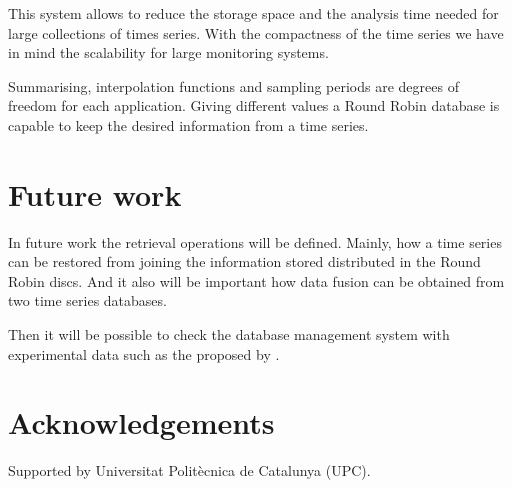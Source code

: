This system allows to reduce the storage space and the analysis time
needed for large collections of times series.  With the compactness of
the time series we have in mind the scalability for large monitoring
systems.

Summarising, interpolation functions and sampling periods are degrees
of freedom for each application. Giving different values a Round Robin
database is capable to keep the desired information from a time series.


\section{Future work}

In future work the retrieval operations will be defined. Mainly, how a
time series can be restored from joining the information stored
distributed in the Round Robin discs. And it also will be important
how data fusion can be obtained from two time series databases.

Then it will be possible to check the database management system with
experimental data such as the proposed by \cite{keogh02}.

          
\section{Acknowledgements}

Supported by Universitat Politècnica de Catalunya (UPC).







